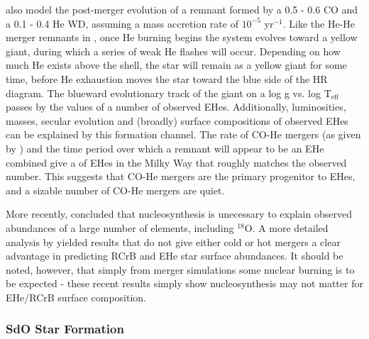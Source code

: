 \cite{saioj02} also model the post-merger evolution of a remnant formed by a 0.5 - 0.6 {\Msun} CO and a 0.1 - 0.4 {\Msun} He WD, assuming a mass accretion rate of $10^{-5}$ {\Msun} yr$^{-1}$.  Like the He-He merger remnants in \cite{saioj00}, once He burning begins the system evolves toward a yellow giant, during which a series of weak He flashes will occur.  Depending on how much He exists above the shell, the star will remain as a yellow giant for some time, before He exhaustion moves the star toward the blue side of the HR diagram.  The blueward evolutionary track of the giant on a log g vs. log T$_{\mathrm{eff}}$ passes by the values of a number of observed EHes.  Additionally, luminosities, masses, secular evolution and (broadly) surface compositions of observed EHes can be explained by this formation channel.  The rate of CO-He mergers (as given by \cite{nele+01a}) and the time period over which a remnant will appear to be an EHe combined give a of EHes in the Milky Way that roughly matches the observed number.  This suggests that CO-He mergers are the primary progenitor to EHes, and a sizable number of CO-He mergers are quiet.


More recently, \cite{pandl11} concluded that nucleosynthesis is unecessary to explain observed abundances of a large number of elements, including $^{18}$O.  A more detailed analysis by \cite{jeff+11} yielded results that do not give either cold or hot mergers a clear advantage in predicting RCrB and EHe star surface abundances.  It should be noted, however, that simply from merger simulations some nuclear burning is to be expected - these recent results simply show nucleosynthesis may not matter for EHe/RCrB surface composition.

\subsubsection{SdO Star Formation}

